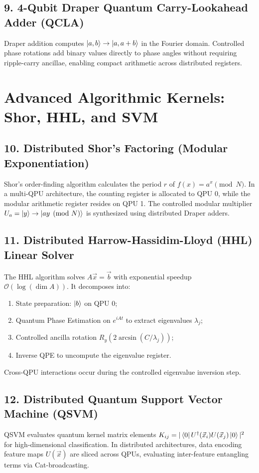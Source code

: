\subsection{9. 4-Qubit Draper Quantum Carry-Lookahead Adder (QCLA)}
Draper addition computes $\ket{a, b} \to \ket{a, a+b}$ in the Fourier domain. Controlled phase rotations add binary values directly to phase angles without requiring ripple-carry ancillae, enabling compact arithmetic across distributed registers.

\section{Advanced Algorithmic Kernels: Shor, HHL, and SVM}
\label{sec:advanced_kernels}

\subsection{10. Distributed Shor's Factoring (Modular Exponentiation)}
Shor's order-finding algorithm calculates the period $r$ of $f(x) = a^x \pmod N$. In a multi-QPU architecture, the counting register is allocated to QPU 0, while the modular arithmetic register resides on QPU 1. The controlled modular multiplier $U_a = \ket{y} \to \ket{a y \pmod N}$ is synthesized using distributed Draper adders.

\subsection{11. Distributed Harrow-Hassidim-Lloyd (HHL) Linear Solver}
The HHL algorithm solves $A \vec{x} = \vec{b}$ with exponential speedup $\mathcal{O}(\log(\dim A))$. It decomposes into:
\begin{enumerate}
    \item State preparation: $\ket{b}$ on QPU 0;
    \item Quantum Phase Estimation on $e^{i A t}$ to extract eigenvalues $\lambda_j$;
    \item Controlled ancilla rotation $R_y(2 \arcsin(C / \lambda_j))$;
    \item Inverse QPE to uncompute the eigenvalue register.
\end{enumerate}
Cross-QPU interactions occur during the controlled eigenvalue inversion step.

\subsection{12. Distributed Quantum Support Vector Machine (QSVM)}
QSVM evaluates quantum kernel matrix elements $K_{ij} = |\bra{0} U^\dagger(\vec{x}_i) U(\vec{x}_j) \ket{0}|^2$ for high-dimensional classification. In distributed architectures, data encoding feature maps $U(\vec{x})$ are sliced across QPUs, evaluating inter-feature entangling terms via Cat-broadcasting.

